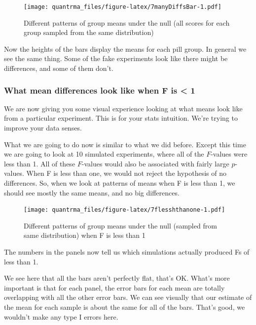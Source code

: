 \documentclass[
]{book}
\begin{document}
\begin{figure}
\centering
\texttt{[image: quantrma\_files/figure-latex/7manyDiffsBar-1.pdf]}
\caption{\label{fig:7manyDiffsBar}Different patterns of group means under the null (all scores for each group sampled from the same distribution)}
\end{figure}

Now the heights of the bars display the means for each pill group. In general we see the same thing. Some of the fake experiments look like there might be differences, and some of them don't.

\hypertarget{what-mean-differences-look-like-when-f-is-1}{%
\subsubsection{What mean differences look like when F is \textless{} 1}\label{what-mean-differences-look-like-when-f-is-1}}

We are now giving you some visual experience looking at what means look like from a particular experiment. This is for your stats intuition. We're trying to improve your data senses.

What we are going to do now is similar to what we did before. Except this time we are going to look at 10 simulated experiments, where all of the \(F\)-values were less than 1. All of these \(F\)-values would also be associated with fairly large \(p\)-values. When F is less than one, we would not reject the hypothesis of no differences. So, when we look at patterns of means when F is less than 1, we should see mostly the same means, and no big differences.

\begin{figure}
\centering
\texttt{[image: quantrma\_files/figure-latex/7flesshthanone-1.pdf]}
\caption{\label{fig:7flesshthanone}Different patterns of group means under the null (sampled from same distribution) when F is less than 1}
\end{figure}

The numbers in the panels now tell us which simulations actually produced Fs of less than 1.

We see here that all the bars aren't perfectly flat, that's OK. What's more important is that for each panel, the error bars for each mean are totally overlapping with all the other error bars. We can see visually that our estimate of the mean for each sample is about the same for all of the bars. That's good, we wouldn't make any type I errors here.
\end{document}
